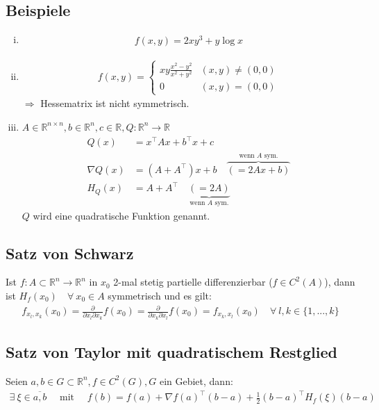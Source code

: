 \documentclass[11pt,a4paper]{book}
\newcommand {\R}	{\mathbb{R}}
\newcommand {\Rn}	{\mathbb{R}^n}
\newcommand {\Rnxn}	{\mathbb{R}^{n \times n}}
\newcommand{\1}    	{\mathbbm{1}}
\newcommand{\mitt}	{\textrm{ mit }}
\begin{document}
\subsection{Beispiele}
\begin{enumerate}[(i)]
	\item \begin{align*}
		f(x,y) = 2xy^3 + y \log x
	\end{align*}
	\item \begin{align*}
		f(x,y) = \left\{ \begin{array}{ll}
			xy \frac{x^2 - y^2}{x^2 + y^2} & (x,y) \neq (0,0) \\
			0 & (x,y) = (0,0)
		\end{array} \right.
	\end{align*}
	\(\Rightarrow\) Hessematrix ist nicht symmetrisch.
	\item \(A \in \Rnxn, b \in \Rn, c \in \R, Q : \Rn \rightarrow \R\)
	\begin{align*}
		Q(x) &= x^\top A x + b^\top x + c \\
		\nabla Q(x) &= \left( A + A^\top \right)x + b \quad \overbrace{( =  2Ax + b)}^{\textrm{wenn }A\textrm{ sym.}} \\
		H_Q(x) &= A + A^\top \quad \underbrace{( = 2A)}_{\textrm{wenn }A\textrm{ sym.}}
	\end{align*}
	\(Q\) wird eine quadratische Funktion genannt.
\end{enumerate}

\subsection{Satz von Schwarz}
Ist \(f : A \subset \Rn \rightarrow \Rn\) in \(x_0\) 2-mal stetig partielle differenzierbar (\(f \in C^2(A)\)), dann ist \(H_f(x_0) \quad \forall~ x_0 \in A\) symmetrisch und es gilt:
\begin{align*}
	f_{x_l, x_k} (x_0) = \frac{\partial}{\partial x_l \partial x_k} f(x_0) = \frac{\partial}{\partial x_k \partial x_l} f(x_0) = f_{x_k, x_l} (x_0) \quad \forall~ l,k \in \{ 1, ..., k \}
\end{align*}

\subsection{Satz von Taylor mit quadratischem Restglied}
Seien \(a,b \in G \subset \Rn, f \in C^2(G), G\) ein Gebiet, dann:
\begin{align*}
	\exists~ \xi \in \overline{a,b} \quad\mitt\quad f(b) = f(a) + \nabla f(a)^\top (b-a) + \frac{1}{2} (b-a)^\top H_f(\xi)(b-a)
\end{align*}
\end{document}
